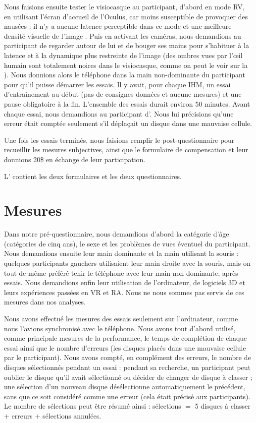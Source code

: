 Nous faisions ensuite tester le visiocasque au participant, d'abord en mode RV, en utilisant l'écran d'accueil de l'Oculus, car moins susceptible de provoquer des nausées : il n'y a aucune latence perceptible dans ce mode et une meilleure densité visuelle de l'image . Puis en activant les caméras, nous demandions au participant de regarder autour de lui et de bouger ses mains pour s'habituer à la latence et à la dynamique plus restreinte de l'image (des ombres vues par l'\oe il humain sont totalement noires dans le visiocasque, comme on peut le voir sur la ). Nous donnions alors le téléphone dans la main non-dominante du participant pour qu'il puisse démarrer les essais. Il y avait, pour chaque IHM, un essai d'entraînement au début (pas de consignes données et aucune mesures) et une pause obligatoire à la fin. L'ensemble des essais durait environ 50 minutes. Avant chaque essai, nous demandions au participant d'. Nous lui précisions qu'une erreur était comptée seulement s'il déplaçait un disque dans une mauvaise cellule.

Une fois les essais terminés, nous faisions remplir le post-questionnaire pour recueillir les mesures subjectives, ainsi que le formulaire de compensation et leur donnions 20\$ en échange de leur participation.

L' contient les deux formulaires et les deux questionnaires.


\section{Mesures}
\label{sec:experiment_measures}

Dans notre pré-questionnaire, nous demandions d'abord la catégorie d'âge (catégories de cinq ans), le sexe et les problèmes de vues éventuel du participant. Nous demandions ensuite leur main dominante et la main utilisant la souris : quelques participants gauchers utilisaient leur main droite avec la souris, mais on tout-de-même préféré tenir le téléphone avec leur main non dominante, après essais. Nous demandions enfin leur utilisation de l'ordinateur, de logiciels 3D et leurs expériences passées en VR et RA. Nous ne nous sommes pas servis de ces mesures dans nos analyses.

Nous avons effectué les mesures des essais seulement sur l'ordinateur, comme nous l'avions synchronisé avec le téléphone. Nous avons tout d'abord utilisé, comme principale mesures de la performance, le temps de complétion de chaque essai ainsi que le nombre d'erreurs (les disques placés dans une mauvaise cellule par le participant). Nous avons compté, en complément des erreurs, le nombre de disques sélectionnés pendant un essai : pendant sa recherche, un participant peut oublier le disque qu'il avait sélectionné ou décider de changer de disque à classer ; une sélection d'un nouveau disque désélectionne automatiquement le précédent, sans que ce soit considéré comme une erreur (cela était précisé aux participants). Le nombre de sélections peut être résumé ainsi : sélections $=$ 5 disques à classer $+$ erreurs $+$ sélections annulées.

